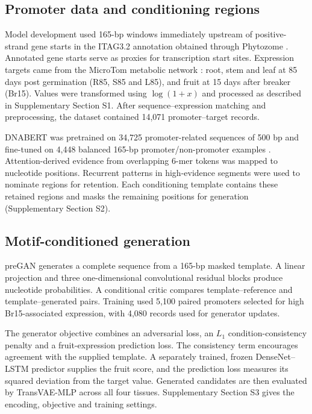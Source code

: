 \documentclass[namedate,webpdf,modern,large]{oup-authoring-template}
\begin{document}
\subsection{Promoter data and conditioning regions}

Model development used 165-bp windows immediately upstream of positive-strand gene starts in the ITAG3.2 annotation obtained through Phytozome \citep{Goodstein2012}. Annotated gene starts serve as proxies for transcription start sites. Expression targets came from the MicroTom metabolic network \citep{Li2020}: root, stem and leaf at 85 days post germination (R85, S85 and L85), and fruit at 15 days after breaker (Br15). Values were transformed using $\log(1+x)$ and processed as described in Supplementary Section S1. After sequence--expression matching and preprocessing, the dataset contained 14,071 promoter--target records.

DNABERT was pretrained on 34,725 promoter-related sequences of 500 bp and fine-tuned on 4,448 balanced 165-bp promoter/non-promoter examples \citep{Ji2021}. Attention-derived evidence from overlapping 6-mer tokens was mapped to nucleotide positions. Recurrent patterns in high-evidence segments were used to nominate regions for retention. Each conditioning template contains these retained regions and masks the remaining positions for generation (Supplementary Section S2).

\subsection{Motif-conditioned generation}

preGAN generates a complete sequence from a 165-bp masked template. A linear projection and three one-dimensional convolutional residual blocks produce nucleotide probabilities. A conditional critic compares template--reference and template--generated pairs. Training used 5,100 paired promoters selected for high Br15-associated expression, with 4,080 records used for generator updates.

The generator objective combines an adversarial loss, an $L_1$ condition-consistency penalty and a fruit-expression prediction loss. The consistency term encourages agreement with the supplied template. A separately trained, frozen DenseNet--LSTM predictor supplies the fruit score, and the prediction loss measures its squared deviation from the target value. Generated candidates are then evaluated by TransVAE-MLP across all four tissues. Supplementary Section S3 gives the encoding, objective and training settings.
\end{document}
